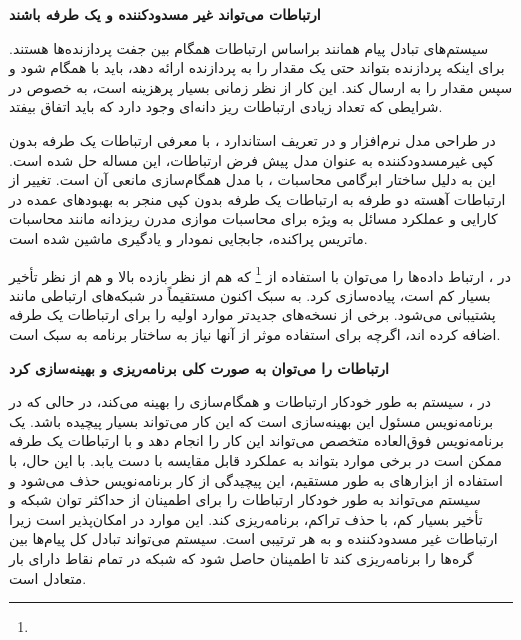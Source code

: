 \textbf{ارتباطات می‌تواند غیر مسدودکننده و یک طرفه باشند}

سیستم‌های تبادل پیام همانند  براساس ارتباطات همگام بین جفت پردازنده‌ها هستند. برای اینکه پردازنده  بتواند حتی یک مقدار را به پردازنده  ارائه دهد، باید با  همگام شود و سپس مقدار را به  ارسال کند. این کار از نظر زمانی بسیار پرهزینه است، به خصوص در شرایطی که تعداد زیادی ارتباطات ریز دانه‌ای  وجود دارد که باید اتفاق بیفتد.

در طراحی مدل نرم‌افزار  و در تعریف استاندارد ، با معرفی ارتباطات یک طرفه بدون کپی غیرمسدودکننده به عنوان مدل پیش فرض ارتباطات، این مساله حل شده است. این به دلیل ساختار ابرگامی محاسبات ، با مدل همگام‌سازی مانعی آن است. تغییر از ارتباطات آهسته دو طرفه  به ارتباطات یک طرفه بدون کپی  منجر به بهبودهای عمده در کارایی و عملکرد مسائل به ویژه برای محاسبات موازی مدرن ریزدانه مانند محاسبات ماتریس پراکنده، جابجایی نمودار و یادگیری ماشین شده است.

در ، ارتباط داده‌ها را می‌توان با استفاده از  \footnote{} که هم از نظر بازده بالا و هم از نظر تأخیر بسیار کم است، پیاده‌سازی کرد.  به سبک  اکنون مستقیماً در شبکه‌های ارتباطی مانند  پشتیبانی می‌شود. برخی از نسخه‌های جدیدتر  موارد اولیه را برای ارتباطات یک طرفه اضافه کرده اند، اگرچه برای استفاده موثر از آنها نیاز به ساختار برنامه  به سبک  است.

\textbf{ارتباطات را می‌توان به صورت کلی برنامه‌ریزی و بهینه‌سازی کرد}

در ، سیستم به طور خودکار ارتباطات و همگام‌سازی را بهینه می‌کند، در حالی که در  برنامه‌نویس مسئول این بهینه‌سازی است که این کار می‌تواند بسیار پیچیده باشد. یک برنامه‌نویس فوق‌العاده متخصص  می‌تواند این کار را انجام دهد و با ارتباطات یک طرفه  ممکن است در برخی موارد بتواند به عملکرد قابل مقایسه با  دست یابد. با این حال، با استفاده از ابزارهای  به طور مستقیم، این پیچیدگی از کار برنامه‌نویس حذف می‌شود و سیستم می‌تواند به طور خودکار ارتباطات را برای اطمینان از حداکثر توان شبکه و تأخیر بسیار کم، با حذف تراکم، برنامه‌ریزی کند. این موارد در  امکان‌پذیر است زیرا ارتباطات غیر مسدودکننده و به هر ترتیبی است. سیستم می‌تواند تبادل کل پیام‌ها بین گره‌ها را برنامه‌ریزی کند تا اطمینان حاصل شود که شبکه در تمام نقاط دارای بار متعادل است.

